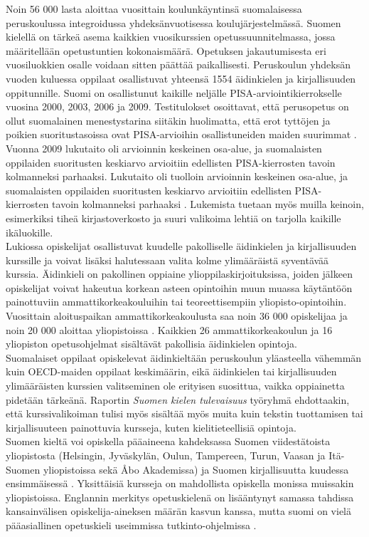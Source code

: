 \begin{multicols}{2}
 
Noin 56 000 lasta aloittaa vuosittain koulunkäyntinsä suomalaisessa
peruskoulussa integroidussa yhdeksänvuotisessa koulujärjestelmässä. Suomen
kielellä on tärkeä asema kaikkien vuosikurssien opetussuunnitelmassa, jossa
määritellään opetustuntien kokonaismäärä. Opetuksen jakautumisesta eri
vuosiluokkien osalle voidaan sitten päättää paikallisesti. Peruskoulun yhdeksän vuoden
kuluessa oppilaat osallistuvat yhteensä 1554 äidinkielen ja kirjallisuuden oppitunnille.
Suomi on osallistunut kaikille neljälle PISA-arviointikierrokselle
vuosina 2000, 2003, 2006 ja 2009. Testitulokset osoittavat, että
perusopetus on ollut suomalainen menestystarina siitäkin huolimatta,
että erot tyttöjen ja poikien suoritustasoissa ovat PISA-arvioihin
osallistuneiden maiden suurimmat \cite{Literacy}. Vuonna 2009 lukutaito 
oli arvioinnin keskeinen osa-alue, ja suomalaisten oppilaiden
suoritusten keskiarvo arvioitiin edellisten PISA-kierrosten tavoin
kolmanneksi parhaaksi. Lukutaito oli tuolloin arvioinnin keskeinen osa-alue, 
ja suomalaisten oppilaiden suoritusten keskiarvo
arvioitiin edellisten PISA-kierrosten tavoin kolmanneksi parhaaksi
\cite{Pisa2006}. Lukemista tuetaan myös muilla keinoin,
esimerkiksi tiheä kirjastoverkosto ja suuri valikoima lehtiä on
tarjolla kaikille ikäluokille.\\
Lukiossa opiskelijat osallistuvat kuudelle pakolliselle
äidinkielen ja kirjallisuuden kurssille ja voivat lisäksi
halutessaan valita kolme ylimääräistä syventävää kurssia. Äidinkieli
on pakollinen oppiaine ylioppilaskirjoituksissa, joiden jälkeen
opiskelijat voivat hakeutua korkean asteen opintoihin muun muassa
käytäntöön painottuviin ammattikorkeakouluihin tai teoreettisempiin
yliopisto-opintoihin. Vuosittain aloituspaikan ammattikorkeakoulusta
saa noin 36 000 opiskelijaa ja noin 20 000 aloittaa yliopistoissa
\cite{Education}. Kaikkien 26 ammattikorkeakoulun ja 16 yliopiston
opetusohjelmat sisältävät pakollisia äidinkielen opintoja.\\
Suomalaiset oppilaat opiskelevat äidinkieltään peruskoulun yläasteella
vähemmän kuin OECD-maiden oppilaat keskimäärin, eikä äidinkielen tai
kirjallisuuden ylimääräisten kurssien valitseminen ole 
erityisen suosittua, vaikka oppiainetta pidetään tärkeänä. Raportin
\textit{Suomen kielen tulevaisuus} \cite{Tulevaisuus2009} työryhmä
ehdottaakin, että kurssivalikoiman tulisi myös sisältää myös muita
kuin tekstin tuottamisen tai kirjallisuuteen painottuvia kursseja,
kuten kielitieteellisiä opintoja.\\
Suomen kieltä voi opiskella pääaineena kahdeksassa Suomen viidestätoista
yliopistosta (Helsingin, Jyväskylän, Oulun, Tampereen, Turun, Vaasan
ja Itä-Suomen yliopistoissa sekä Åbo Akademissa) ja Suomen kirjallisuutta
kuudessa ensimmäisessä \cite{hum-ulko}. Yksittäisiä kursseja on mahdollista 
opiskella monissa muissakin yliopistoissa. Englannin merkitys opetuskielenä on
lisääntynyt samassa tahdissa kansainvälisen opiskelija-aineksen määrän
kasvun kanssa, mutta suomi on vielä pääasiallinen opetuskieli
useimmissa tutkinto-ohjelmissa \cite{Board}.




\end{multicols}
